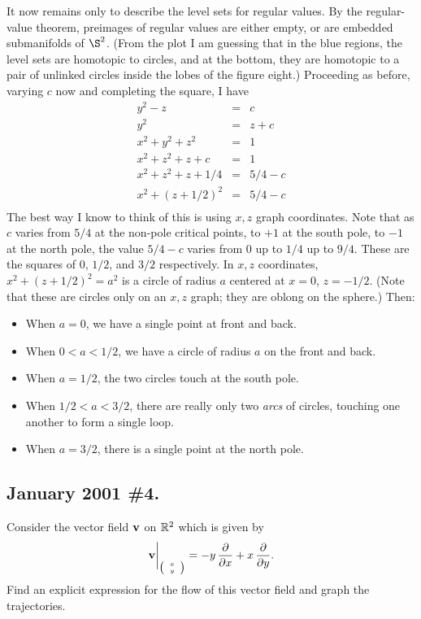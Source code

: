 \documentclass[10pt]{article}
\numberwithin{equation}{subsection}
\begin{document}
It now remains only to describe the level sets for regular values.  By the
regular-value theorem, preimages of regular values are either empty, or are
embedded submanifolds of $\S^2$.  (From the plot I am guessing that in the blue
regions, the level sets are homotopic to circles, and at the bottom, they are
homotopic to a pair of unlinked circles inside the lobes of the figure eight.)
Proceeding as before, varying $c$ now and completing the square, I have
\begin{eqnarray*}
	y^2 - z &=& c \\
	y^2 &=& z + c \\
	x^2 + y^2 + z^2 &=& 1 \\
	x^2 + z^2 + z + c &=& 1 \\
	x^2 + z^2 + z + 1/4 &=& 5/4 - c \\
	x^2 + (z +1/2)^2 &=& 5/4 - c \\
\end{eqnarray*}
The best way I know to think of this is using $x,z$ graph coordinates.  Note
that as $c$ varies from $5/4$ at the non-pole critical points, to $+1$ at the
south pole, to $-1$ at the north pole, the value $5/4-c$ varies from 0 up to
$1/4$ up to $9/4$.  These are the squares of $0$, $1/2$, and $3/2$
respectively.  In $x,z$ coordinates, $x^2 + (z +1/2)^2 = a^2$ is a circle of
radius $a$ centered at $x=0$, $z=-1/2$.  (Note that these are circles only on
an $x,z$ graph; they are oblong on the sphere.)  Then:
\begin{itemize}
\item When $a=0$, we have a single point at front and back.
\item When $0<a<1/2$, we have a circle of radius $a$ on the
front and back.
\item When $a=1/2$, the two circles touch at the south pole.
\item When $1/2<a<3/2$, there are really only two \emph{arcs} of circles,
touching one another to form a single loop.
\item When $a=3/2$, there is a single point at the north pole.
\end{itemize}

\subsection{January 2001 \#4.}

Consider the vector field $\mathbf{v}$ on $\mathbb{R}^2$ which is given by
$$
	\mathbf{v}\bigg|_{\tiny{\left(\begin{array}{r} x \\ y \end{array}\right)}} = -y\, \frac{\partial}{\partial x} + x \,\frac{\partial}{\partial y}.
$$
Find an explicit expression for the flow of this vector field and graph the
trajectories.
\end{document}
